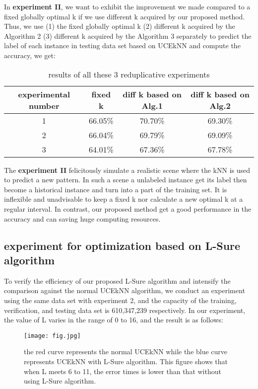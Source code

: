 \documentclass[runningheads]{llncs}
\begin{document}
In \textbf{experiment II}, we want to exhibit the improvement we made compared to a fixed globally optimal k if we use different k acquired by our proposed method. Thus, we use (1) the fixed globally optimal k (2) different k acquired by the Algorithm 2 (3) different k acquired by the Algorithm 3 separately to predict the label of each instance in testing data set based on UCEkNN and compute the accuracy, we get:

\begin{table}
\begin{center}
\caption{results of all these 3 reduplicative experiments}\label{tab1}
\begin{tabular}{|c|c|c|c|}
\hline
experimental number &  fixed k & diff k based on Alg.1 & diff k based on Alg.2\\
\hline
1 & 66.05\% & 70.70\%& 69.30\%\\
2 & 66.04\% & 69.79\%& 69.09\% \\
3 & 64.01\% & 67.36\%& 67.78\%\\
\hline
\end{tabular}    
\end{center}
\end{table}

The \textbf{experiment II} felicitously simulate a realistic scene where the kNN is used to predict a new pattern. In such a scene a unlabeled instance get its label then become a historical instance and turn into a part of the training set. It is inflexible and unadvisable to keep a fixed k nor calculate a new optimal k at a regular interval. In contrast, our proposed method get a good performance in the accuracy and can saving huge computing resources.

\subsection{experiment for optimization based on L-Sure algorithm}
To verify the efficiency of our proposed L-Sure algorithm and intensify the comparison against the normal UCEkNN algorithm, we conduct an experiment using the same data set with experiment 2,    and the capacity of the training, verification, and testing data set is  610,347,239 respectively. In our experiment, the value of L varies in the range of 0 to 16, and the result is as follows:

\begin{figure}
\texttt{[image: fig.jpg]}
\caption{the red curve represents the normal UCEkNN while the blue curve represents UCEkNN with L-Sure algorithm. This figure shows that when L meets 6 to 11, the error times is lower than that without using L-Sure algorithm.} \label{fig1}
\end{figure}
\end{document}
